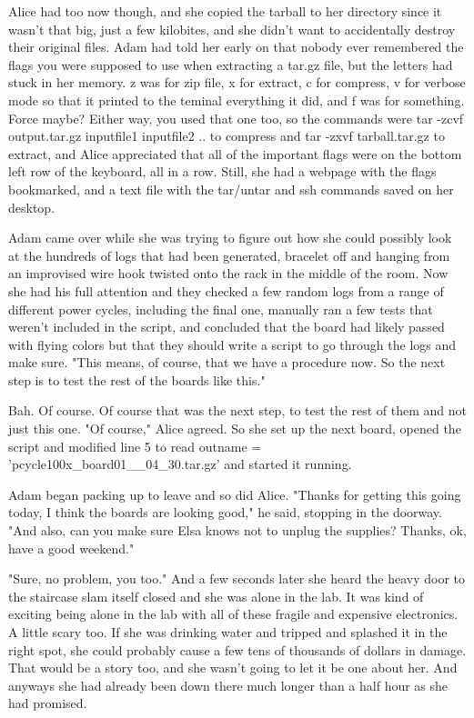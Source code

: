 Alice had too now though, and she copied the tarball to her directory since it wasn't that big, just a few kilobites, and she didn't want to accidentally destroy their original files. Adam had told her early on that nobody ever remembered the flags you were supposed to use when extracting a tar.gz file, but the letters had stuck in her memory. {\ttfamily z} was for zip file, {\ttfamily x} for extract, {\ttfamily c} for compress, {\ttfamily v} for verbose mode so that it printed to the teminal everything it did, and {\ttfamily f} was for something. Force maybe? Either way, you used that one too, so the commands were {\ttfamily tar -zcvf output.tar.gz inputfile1 inputfile2 ..} to compress and  {\ttfamily tar -zxvf tarball.tar.gz} to extract, and Alice appreciated that all of the important flags were on the bottom left row of the keyboard, all in a row. Still, she had a webpage with the flags bookmarked, and a text file with the tar/untar and ssh commands saved on her desktop.

\mypause

Adam came over while she was trying to figure out how she could possibly look at the hundreds of logs that had been generated, bracelet off and hanging from an improvised wire hook twisted onto the rack in the middle of the room. Now she had his full attention and they checked a few random logs from a range of different power cycles, including the final one, manually ran a few tests that weren't included in the script, and concluded that the board had likely passed with flying colors but that they should write a script to go through the logs and make sure. "This means, of course, that we have a procedure now. So the next step is to test the rest of the boards like this." 

Bah. Of course. Of course that was the next step, to test the rest of them and not just this one. "Of course," Alice agreed. So she set up the next board, opened the script and modified line 5 to read {\ttfamily outname =} {\ttfamily  'pcycle100x\_\-board01\_\_04\_30.tar.gz'} and started it running.

Adam began packing up to leave and so did Alice. "Thanks for getting this going today, I think the boards are looking good," he said, stopping in the doorway. "And also, can you make sure Elsa knows not to unplug the supplies? Thanks, ok, have a good weekend."

"Sure, no problem, you too." And a few seconds later she heard the heavy door to the staircase slam itself closed and she was alone in the lab. It was kind of exciting being alone in the lab with all of these fragile and expensive electronics. A little scary too. If she was drinking water and tripped and splashed it in the right spot, she could probably cause a few tens of thousands of dollars in damage. That would be a story too, and she wasn't going to let it be one about her. And anyways she had already been down there much longer than a half hour as she had promised.

